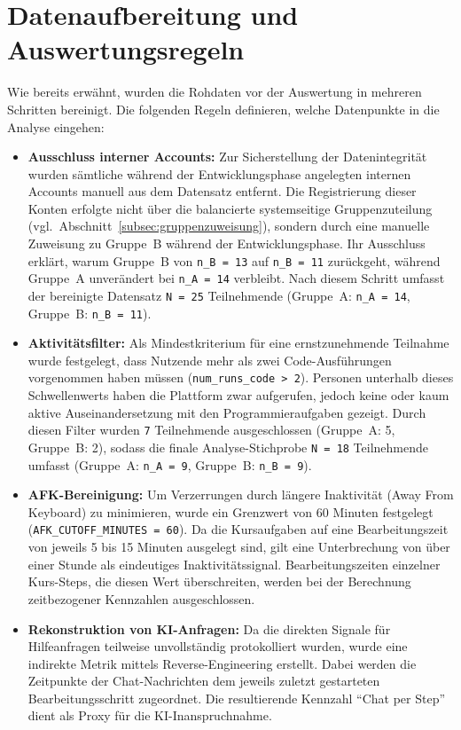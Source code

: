 \section{Datenaufbereitung und Auswertungsregeln}\label{sec:datenaufbereitung}

Wie bereits erwähnt, wurden die Rohdaten vor der Auswertung in mehreren Schritten bereinigt. Die folgenden Regeln definieren, welche Datenpunkte in die Analyse eingehen:

\begin{itemize}
    \item \textbf{Ausschluss interner Accounts:} Zur Sicherstellung der Datenintegrität wurden sämtliche während der Entwicklungsphase angelegten internen Accounts manuell aus dem Datensatz entfernt.
    Die Registrierung dieser Konten erfolgte nicht über die balancierte systemseitige Gruppenzuteilung (vgl.\ Abschnitt~\ref{subsec:gruppenzuweisung}), sondern durch eine manuelle Zuweisung zu Gruppe~B während der Entwicklungsphase. Ihr Ausschluss erklärt, warum Gruppe~B von \texttt{n\_B = 13} auf \texttt{n\_B = 11} zurückgeht, während Gruppe~A unverändert bei \texttt{n\_A = 14} verbleibt. Nach diesem Schritt umfasst der bereinigte Datensatz \texttt{N = 25} Teilnehmende (Gruppe~A: \texttt{n\_A = 14}, Gruppe~B: \texttt{n\_B = 11}).
    \item \textbf{Aktivitätsfilter:} Als Mindestkriterium für eine ernstzunehmende Teilnahme wurde festgelegt, dass Nutzende mehr als zwei Code-Ausführungen vorgenommen haben müssen (\texttt{num\_runs\_code > 2}). Personen unterhalb dieses Schwellenwerts haben die Plattform zwar aufgerufen, jedoch keine oder kaum aktive Auseinandersetzung mit den Programmieraufgaben gezeigt. Durch diesen Filter wurden \texttt{7} Teilnehmende ausgeschlossen (Gruppe~A: 5, Gruppe~B: 2), sodass die finale Analyse-Stichprobe \texttt{N = 18} Teilnehmende umfasst (Gruppe~A: \texttt{n\_A = 9}, Gruppe~B: \texttt{n\_B = 9}).
    \item \textbf{AFK-Bereinigung:} Um Verzerrungen durch längere Inaktivität (Away From Keyboard) zu minimieren, wurde ein Grenzwert von 60 Minuten festgelegt (\texttt{AFK\_CUTOFF\_MINUTES = 60}). Da die Kursaufgaben auf eine Bearbeitungszeit von jeweils 5 bis 15 Minuten ausgelegt sind, gilt eine Unterbrechung von über einer Stunde als eindeutiges Inaktivitätssignal. Bearbeitungszeiten einzelner Kurs-Steps, die diesen Wert überschreiten, werden bei der Berechnung zeitbezogener Kennzahlen ausgeschlossen.
    \clearpage
    \item \textbf{Rekonstruktion von KI-Anfragen:} Da die direkten Signale für Hilfeanfragen teilweise unvollständig protokolliert wurden, wurde eine indirekte Metrik mittels Reverse-Engineering erstellt. Dabei werden die Zeitpunkte der Chat-Nachrichten dem jeweils zuletzt gestarteten Bearbeitungsschritt zugeordnet. Die resultierende Kennzahl \enquote{Chat per Step} dient als Proxy für die KI-Inanspruchnahme.
\end{itemize}


